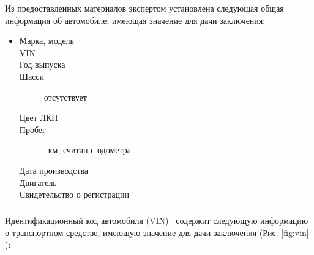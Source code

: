 \par Из предоставленных материалов   экспертом установлена следующая общая информация об автомобиле, имеющая значение для дачи заключения:
\parbox[]{10cm}{}
\begin{itemize}
	\item[ ] 
	\begin{description}
		\item[Марка, модель] \hfill {}
		\item[VIN] \hfill \vin
		\item[Год выпуска] \hfill {}
		\item[Шасси] \hfill отсутствует
		\item[Цвет ЛКП] \hfill {}
		\item[Пробег] \hfill  {}\, км, считан с одометра
		\item[Дата производства] \hfill {}
		\item[Двигатель] \hfill {}
		\item[Свидетельство о регистрации] \hfill {}
	\end{description}
\end{itemize}

\subparagraph*{} Идентификационный код автомобиля (VIN)  \vin \, содержит следующую информацию о транспортном средстве, имеющую значение для 	дачи заключения (Рис. \ref{fig:vin} ):\\[3mm]
%	
%	


